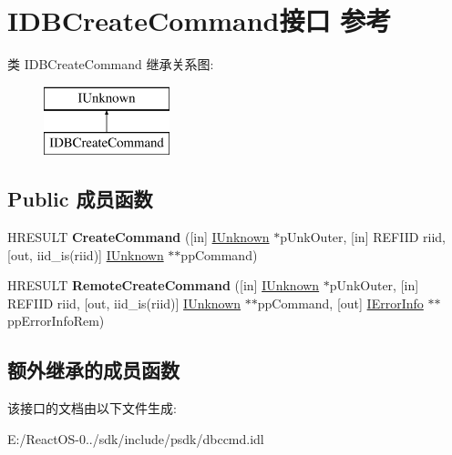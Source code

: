 \hypertarget{interface_i_d_b_create_command}{}\section{I\+D\+B\+Create\+Command接口 参考}
\label{interface_i_d_b_create_command}
类 I\+D\+B\+Create\+Command 继承关系图\+:\begin{figure}[H]
\begin{center}
\leavevmode
\includegraphics[height=2.000000cm]{interface_i_d_b_create_command}
\end{center}
\end{figure}
\subsection*{Public 成员函数}
\begin{DoxyCompactItemize}
\item 
\mbox{\label{interface_i_d_b_create_command_ab12f2df47ac0146d398b070f5c74cb6d}} 
H\+R\+E\+S\+U\+LT {\bfseries Create\+Command} (\mbox{[}in\mbox{]} \hyperlink{interface_i_unknown}{I\+Unknown} $\ast$p\+Unk\+Outer, \mbox{[}in\mbox{]} R\+E\+F\+I\+ID riid, \mbox{[}out, iid\+\_\+is(riid)\mbox{]} \hyperlink{interface_i_unknown}{I\+Unknown} $\ast$$\ast$pp\+Command)
\item 
\mbox{\label{interface_i_d_b_create_command_a04aea6fc75e0460edde9e4d1587117d3}} 
H\+R\+E\+S\+U\+LT {\bfseries Remote\+Create\+Command} (\mbox{[}in\mbox{]} \hyperlink{interface_i_unknown}{I\+Unknown} $\ast$p\+Unk\+Outer, \mbox{[}in\mbox{]} R\+E\+F\+I\+ID riid, \mbox{[}out, iid\+\_\+is(riid)\mbox{]} \hyperlink{interface_i_unknown}{I\+Unknown} $\ast$$\ast$pp\+Command, \mbox{[}out\mbox{]} \hyperlink{interface_i_error_info}{I\+Error\+Info} $\ast$$\ast$pp\+Error\+Info\+Rem)
\end{DoxyCompactItemize}
\subsection*{额外继承的成员函数}


该接口的文档由以下文件生成\+:\begin{DoxyCompactItemize}
\item 
E\+:/\+React\+O\+S-\/0../sdk/include/psdk/dbccmd.\+idl\end{DoxyCompactItemize}
